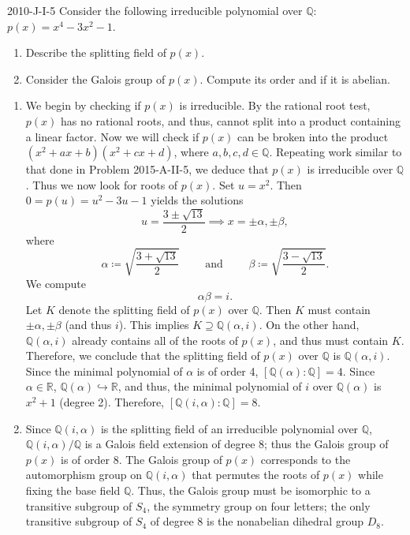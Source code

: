 \documentclass{article}
\newcommand{\embedd}{\hookrightarrow}
\begin{document}
	\begin{prb}{2010-J-I-5}
		Consider the following irreducible polynomial over $\mathbb{Q}$: $p(x) = x^{4} - 3x^{2} - 1$. \vspace{-0.25cm} 
		\begin{enumerate}[itemsep =-2pt,label = (\alph{*})]
			\item Describe the splitting field of $p(x)$. 
			\item Consider the Galois group of $p(x)$. Compute its order and if it is abelian. 
		\end{enumerate}
	\end{prb}
	\begin{enumerate}[itemsep =-2pt,label = (\alph{*})]
		\item We begin by checking if $p(x)$ is irreducible. By the rational root test, $p(x)$ has no rational roots, and thus, cannot split into a product containing a linear factor. Now we will check if $p(x)$ can be broken into the product $(x^{2} + ax + b)(x^{2} + cx + d)$, where $a, b, c, d \in \mathbb{Q}$. Repeating work similar to that done in Problem 2015-A-II-5, we deduce that $p(x)$ is irreducible over $\mathbb{Q}$. Thus we now look for roots of $p(x)$. Set $u = x^{2}$. Then $0 = p(u) = u^{2} - 3u -1$ yields the solutions 
		\begin{equation*}
			u = \frac{3 \pm \sqrt{13}}{2} \implies x = \pm \alpha, \pm \beta, 
		\end{equation*}
		where 
		\begin{equation*}
			\alpha \coloneqq \sqrt{\frac{3 + \sqrt{13}}{2}} \qquad \text{ and } \qquad \beta \coloneqq \sqrt{\frac{3 - \sqrt{13}}{2}}. 
		\end{equation*}
		We compute 
		\begin{equation*}
			\alpha \beta = i. 
		\end{equation*}
		Let $K$ denote the splitting field of $p(x)$ over $\mathbb{Q}$. Then $K$ must contain $\pm \alpha, \pm \beta$ (and thus $i$). This implies $K \supseteq \mathbb{Q}(\alpha, i)$. On the other hand, $\mathbb{Q}(\alpha, i)$ already contains all of the roots of $p(x)$, and thus must contain $K$. Therefore, we conclude that the splitting field of $p(x)$ over $\mathbb{Q}$ is $\mathbb{Q}(\alpha, i)$. Since the minimal polynomial of $\alpha$ is of order 4, $[\mathbb{Q}(\alpha): \mathbb{Q}] = 4$. Since $\alpha \in \mathbb{R}$, $\mathbb{Q}(\alpha) \embedd \mathbb{R}$, and thus, the minimal polynomial of $i$ over $\mathbb{Q}(\alpha)$ is $x^{2} + 1$ (degree 2). Therefore, $[\mathbb{Q}(i,\alpha): \mathbb{Q}] = 8$. 
		\item Since $\mathbb{Q}(i,\alpha)$ is the splitting field of an irreducible polynomial over $\mathbb{Q}$, $\mathbb{Q}(i,\alpha)/\mathbb{Q}$ is a Galois field extension of degree 8; thus the Galois group of $p(x)$ is of order 8. The Galois group of $p(x)$ corresponds to the automorphism group on $\mathbb{Q}(i,\alpha)$ that permutes the roots of $p(x)$ while fixing the base field $\mathbb{Q}$. Thus, the Galois group must be isomorphic to a transitive subgroup of $S_{4}$, the symmetry group on four letters; the only transitive subgroup of $S_{4}$ of degree 8 is the nonabelian dihedral group $D_{8}$. 
	\end{enumerate}
	
\end{document}

